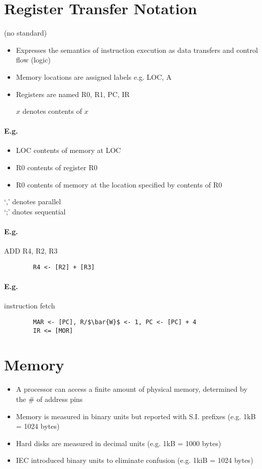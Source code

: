 \documentclass[12pt]{report}
\begin{document}
  \section{Register Transfer Notation}
    (no standard)
    \begin{itemize}
      \item Expresses the semantics of instruction execution as data transfers
      and control flow (logic)
      \item Memory locations are assigned labels e.g. LOC, A
      \item Registers are named R0, R1, PC, IR
      \item [$x$] denotes contents of $x$
    \end{itemize}
    \paragraph{E.g.}
    \begin{itemize}
      \item \lbrack{}LOC\rbrack{} contents of memory at LOC
      \item \lbrack{}R0\rbrack{} contents of register R0
      \item \lbrack\lbrack{}R0\rbrack\rbrack{} contents of memory at the location specified by contents of
        R0
    \end{itemize}
    `,' denotes parallel\\
    `;' dnotes sequential

    \paragraph{E.g.} ADD R4, R2, R3
      \begin{lstlisting}
        R4 <- [R2] + [R3]
      \end{lstlisting}

    \paragraph{E.g.} instruction fetch
      \begin{lstlisting}
        MAR <- [PC], R/$\bar{W}$ <- 1, PC <- [PC] + 4
        IR <= [MOR]
      \end{lstlisting}

  \section{Memory}
    \begin{itemize}
      \item A processor can access a finite amount of physical memory,
      determined by the \# of address pins
      \item Memory is measured in binary units but reported with S.I. prefixes
      (e.g. 1kB = 1024 bytes)
      \item Hard disks are measured in decimal units (e.g. 1kB = 1000 bytes)
      \item IEC introduced binary units to eliminate confusion (e.g. 1kiB = 1024
      bytes)
    \end{itemize}
\end{document}
